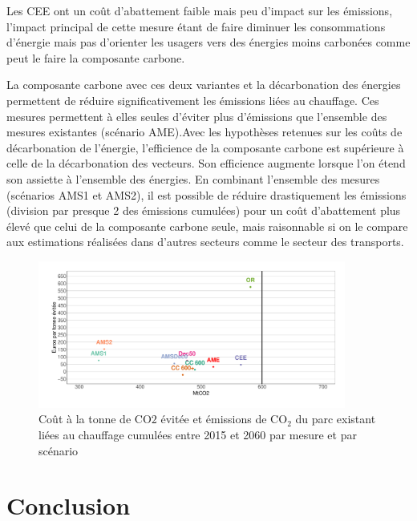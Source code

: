 \documentclass[10.5pt,a4paper]{article}
\begin{document}
{Les CEE ont un coût d'abattement faible mais peu d'impact sur les émissions, l'impact principal de cette mesure étant de faire diminuer les consommations d'énergie mais pas d'orienter les 
usagers vers des énergies moins carbonées comme peut le faire la composante carbone. 

La composante carbone avec ces deux variantes et la décarbonation des énergies permettent de réduire significativement les émissions liées au chauffage. Ces mesures permettent à elles seules d'éviter plus d'émissions que l'ensemble des mesures existantes (scénario AME).Avec les hypothèses retenues sur les coûts de décarbonation de l'énergie, l'efficience de la composante carbone est supérieure à celle de la décarbonation des vecteurs. Son efficience augmente lorsque l'on étend son assiette à l'ensemble des énergies. En combinant l'ensemble des mesures (scénarios AMS1 et AMS2), il est possible de réduire drastiquement les émissions (division par presque 2 des émissions cumulées)  pour un coût d'abattement plus élevé que celui de la composante carbone seule, mais raisonnable si on le compare aux estimations réalisées dans d'autres secteurs comme le secteur des transports. 


\begin{figure}[h!]
\centering 
\caption{Coût à la tonne de CO$2$ évitée et émissions de CO$_2$ du parc existant liées au chauffage cumulées  entre 2015 et 2060 par mesure et par scénario}\label{compmesures}  
\includegraphics[width = 0.9\textwidth]{compmesures}  
\end{figure}

\cleardoublepage

\section{Conclusion}\label{sec:marker7}


\cleardoublepage

}
\end{document}
